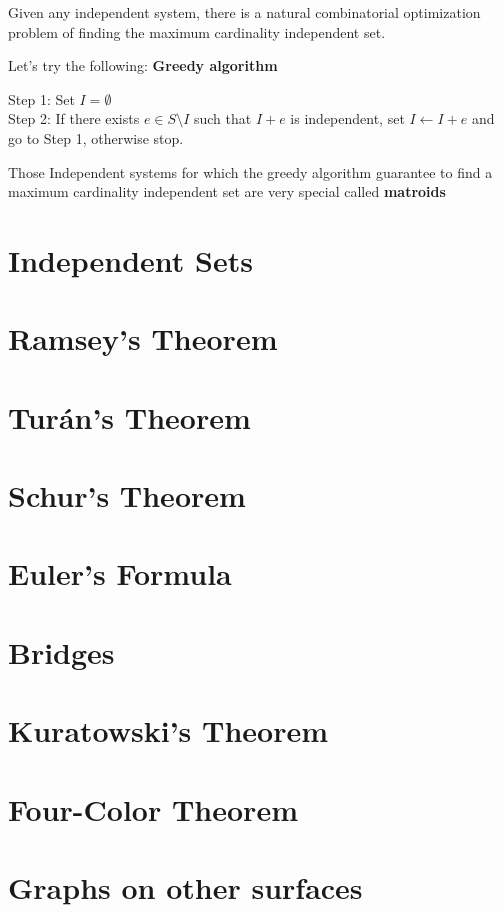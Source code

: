 				Given any independent system, there is a natural combinatorial optimization problem of finding the maximum cardinality independent set. 

				Let's try the following: \textbf{Greedy algorithm}

				Step 1: Set $I=\emptyset$\\
				Step 2: If there exists $e\in S \setminus I$ such that $I + e$ is independent, set $I \leftarrow I+e$ and go to Step 1, otherwise stop.

				Those Independent systems for which the greedy algorithm guarantee to find a maximum cardinality independent set are very special called \textbf{matroids}

			\section{Independent Sets}

			\section{Ramsey's Theorem}

			\section{Tur\'{a}n's Theorem}

			\section{Schur's Theorem}

			\section{Euler's Formula}

			\section{Bridges}

			\section{Kuratowski's Theorem}

			\section{Four-Color Theorem}

			\section{Graphs on other surfaces}


